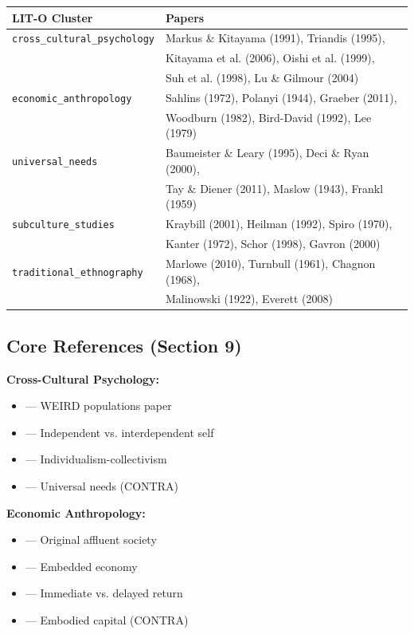 \begin{center}
\small
\begin{tabular}{@{}ll@{}}
\toprule
\textbf{LIT-O Cluster} & \textbf{Papers} \\
\midrule
\texttt{cross\_cultural\_psychology} & Markus \& Kitayama (1991), Triandis (1995), \\
 & Kitayama et al. (2006), Oishi et al. (1999), \\
 & Suh et al. (1998), Lu \& Gilmour (2004) \\
\midrule
\texttt{economic\_anthropology} & Sahlins (1972), Polanyi (1944), Graeber (2011), \\
 & Woodburn (1982), Bird-David (1992), Lee (1979) \\
\midrule
\texttt{universal\_needs} & Baumeister \& Leary (1995), Deci \& Ryan (2000), \\
 & Tay \& Diener (2011), Maslow (1943), Frankl (1959) \\
\midrule
\texttt{subculture\_studies} & Kraybill (2001), Heilman (1992), Spiro (1970), \\
 & Kanter (1972), Schor (1998), Gavron (2000) \\
\midrule
\texttt{traditional\_ethnography} & Marlowe (2010), Turnbull (1961), Chagnon (1968), \\
 & Malinowski (1922), Everett (2008) \\
\bottomrule
\end{tabular}
\end{center}

\subsection*{Core References (Section 9)}

\textbf{Cross-Cultural Psychology:}
\begin{itemize}[nosep]
\item \cite{henrich2010weirdest} --- WEIRD populations paper
\item \cite{markus1991culture} --- Independent vs. interdependent self
\item \cite{triandis1995individualism} --- Individualism-collectivism
\item \cite{tay2011needs} --- Universal needs (CONTRA)
\end{itemize}

\textbf{Economic Anthropology:}
\begin{itemize}[nosep]
\item \cite{sahlins1972stone} --- Original affluent society
\item \cite{polanyi1944great} --- Embedded economy
\item \cite{woodburn1982egalitarian} --- Immediate vs. delayed return
\item \cite{kaplan2000theory} --- Embodied capital (CONTRA)
\end{itemize}

